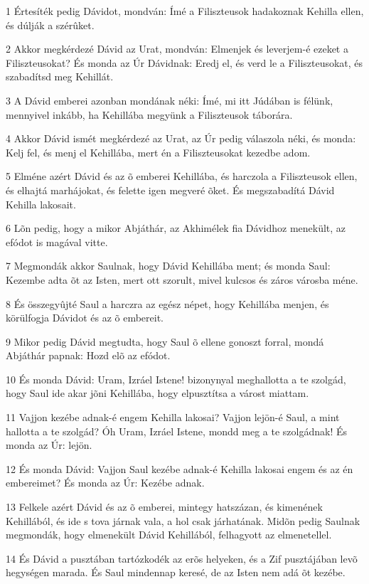 \par 1 Értesíték pedig Dávidot, mondván: Ímé a Filiszteusok hadakoznak Kehilla ellen, és dúlják a szérûket.
\par 2 Akkor megkérdezé Dávid az Urat, mondván: Elmenjek és leverjem-é ezeket a Filiszteusokat? És monda az Úr Dávidnak: Eredj el, és verd le a Filiszteusokat, és szabadítsd meg Kehillát.
\par 3 A Dávid emberei azonban mondának néki: Ímé, mi itt Júdában is félünk, mennyivel inkább, ha Kehillába megyünk a Filiszteusok táborára.
\par 4 Akkor Dávid ismét megkérdezé az Urat, az Úr pedig válaszola néki, és monda: Kelj fel, és menj el Kehillába, mert én a Filiszteusokat kezedbe adom.
\par 5 Elméne azért Dávid és az õ emberei Kehillába, és harczola a Filiszteusok ellen, és elhajtá marhájokat, és felette igen megveré õket. És megszabadítá Dávid Kehilla lakosait.
\par 6 Lõn pedig, hogy a mikor Abjáthár, az Akhimélek fia Dávidhoz menekült, az efódot is magával vitte.
\par 7 Megmondák akkor Saulnak, hogy Dávid Kehillába ment; és monda Saul: Kezembe adta õt az Isten, mert ott szorult, mivel kulcsos és záros városba méne.
\par 8 És összegyûjté Saul a harczra az egész népet, hogy Kehillába menjen, és körülfogja Dávidot és az õ embereit.
\par 9 Mikor pedig Dávid megtudta, hogy Saul õ ellene gonoszt forral, mondá Abjáthár papnak: Hozd elõ az efódot.
\par 10 És monda Dávid: Uram, Izráel Istene! bizonynyal meghallotta a te szolgád, hogy Saul ide akar jõni Kehillába, hogy elpusztítsa a várost miattam.
\par 11 Vajjon kezébe adnak-é engem Kehilla lakosai? Vajjon lejön-é Saul, a mint hallotta a te szolgád? Óh Uram, Izráel Istene, mondd meg a te szolgádnak! És monda az Úr: lejön.
\par 12 És monda Dávid: Vajjon Saul kezébe adnak-é Kehilla lakosai engem és az én embereimet? És monda az Úr: Kezébe adnak.
\par 13 Felkele azért Dávid és az õ emberei, mintegy hatszázan, és kimenének Kehillából, és ide s tova járnak vala, a hol csak járhatának. Midõn pedig Saulnak megmondák, hogy elmenekült Dávid Kehillából, felhagyott az elmenetellel.
\par 14 És Dávid a pusztában tartózkodék az erõs helyeken, és a Zif pusztájában levõ hegységen marada. És Saul mindennap keresé, de az Isten nem adá õt kezébe.
